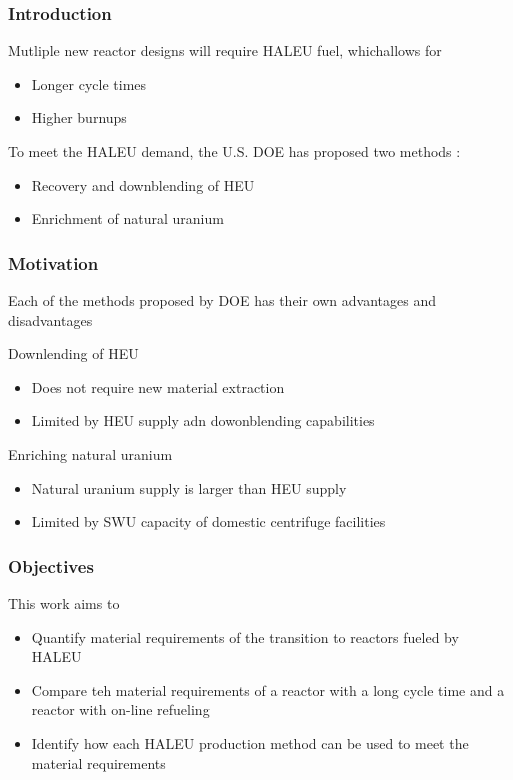 \begin{frame}
    \frametitle{Introduction}
    Mutliple new reactor designs will require \gls{HALEU} fuel, whichallows for 
    \begin{itemize}
        \item Longer cycle times
        \item Higher burnups 
    \end{itemize}
    To meet the \gls{HALEU} demand, the U.S. \gls{DOE} has proposed two methods
    \cite{griffith_overview_2020}:
    \begin{itemize}
        \item Recovery and downblending of \gls{HEU}
        \item Enrichment of natural uranium
    \end{itemize}

\end{frame}

\begin{frame}
    \frametitle{Motivation}
    Each of the methods proposed by \gls{DOE} has their own advantages and 
    disadvantages \par
    Downlending of \gls{HEU}
    \begin{itemize}
        \item Does not require new material extraction
        \item Limited by \gls{HEU} supply adn dowonblending capabilities
    \end{itemize}
    Enriching natural uranium 
    \begin{itemize}
        \item Natural uranium supply is larger than \gls{HEU} supply
        \item Limited by \gls{SWU} capacity of domestic centrifuge facilities
    \end{itemize}
\end{frame}

\begin{frame}
    \frametitle{Objectives}
    This work aims to 
    \begin{itemize}
        \item Quantify material requirements of the transition to reactors 
              fueled by \gls{HALEU}
        \item Compare teh material requirements of a reactor with a long cycle 
              time and a reactor with on-line refueling
        \item Identify how each \gls{HALEU} production method can be used to 
              meet the material requirements
    \end{itemize}
\end{frame}